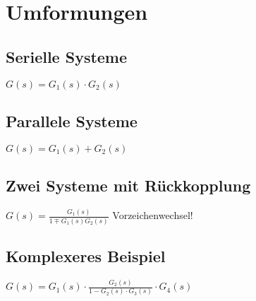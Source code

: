 \section{Umformungen}
	\subsection{Serielle Systeme}
		
		$G(s) = G_1(s) \cdot G_2(s)$
	\subsection{Parallele Systeme}
		
		$G(s) = G_1(s) + G_2(s)$
	\subsection{Zwei Systeme mit Rückkopplung}
		
		$G(s) = \frac{G_1(s)}{1 \mp G_1(s) G_2(s)}$ Vorzeichenwechsel!
	\subsection{Komplexeres Beispiel}
		
		$G(s) = G_1(s) \cdot \frac{G_2(s)}{1-G_2(s) \cdot G_3(s)} \cdot G_4(s)$
